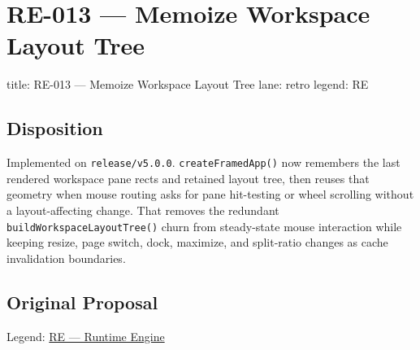 \chapter{RE-013 --- Memoize Workspace Layout Tree}\label{record-399}

\smallskip

\begin{RecordMeta}
title: RE-013 — Memoize Workspace Layout Tree
lane: retro
legend: RE

\end{RecordMeta}

\section{Disposition}\label{record-399-disposition}

Implemented on \texttt{r\allowbreak{}e\allowbreak{}l\allowbreak{}e\allowbreak{}a\allowbreak{}s\allowbreak{}e\allowbreak{}/\allowbreak{}v\allowbreak{}5\allowbreak{}.\allowbreak{}0\allowbreak{}.\allowbreak{}0}. \texttt{c\allowbreak{}r\allowbreak{}e\allowbreak{}a\allowbreak{}t\allowbreak{}e\allowbreak{}F\allowbreak{}r\allowbreak{}a\allowbreak{}m\allowbreak{}e\allowbreak{}d\allowbreak{}A\allowbreak{}p\allowbreak{}p\allowbreak{}(\allowbreak{})} now remembers the last rendered workspace pane rects and retained layout tree, then reuses that geometry when mouse routing asks for pane hit-testing or wheel scrolling without a layout-affecting change. That removes the redundant \texttt{b\allowbreak{}u\allowbreak{}i\allowbreak{}l\allowbreak{}d\allowbreak{}W\allowbreak{}o\allowbreak{}r\allowbreak{}k\allowbreak{}s\allowbreak{}p\allowbreak{}a\allowbreak{}c\allowbreak{}e\allowbreak{}L\allowbreak{}a\allowbreak{}y\allowbreak{}o\allowbreak{}u\allowbreak{}t\allowbreak{}T\allowbreak{}r\allowbreak{}e\allowbreak{}e\allowbreak{}(\allowbreak{})} churn from steady-state mouse interaction while keeping resize, page switch, dock, maximize, and split-ratio changes as cache invalidation boundaries.

\section{Original Proposal}\label{record-399-original-proposal}

Legend: \href{https://github.com/flyingrobots/bijou/blob/1853ad902f6bf219326409e7f743a5a1d6517dbc/docs/method/legends/RE-runtime-engine.md}{RE --- Runtime Engine}

